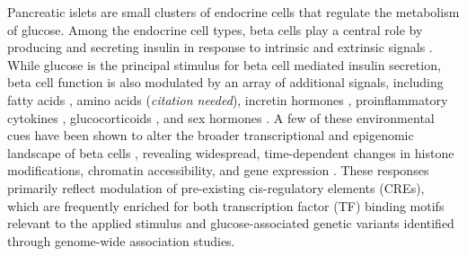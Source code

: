 Pancreatic islets are small clusters of endocrine cells that regulate the metabolism of glucose. Among the endocrine cell types, beta cells play a central role by producing and secreting insulin in response to intrinsic and extrinsic signals \cite{Prentki2013-vx}. While glucose is the principal stimulus for beta cell mediated insulin secretion, beta cell function is also modulated by an array of additional signals, including fatty acids \cite{Fu2013-cf,Mauvais-Jarvis2016-gm,Ramos-Rodriguez2019-ha,Aylward2021-nw}, amino acids (\textit{citation needed}), incretin hormones \cite{Saxena2010-ui}, proinflammatory cytokines \cite{Benaglio2022-rq}, glucocorticoids \cite{Aylward2021-nw,Reddy2009-qu}, and sex hormones \cite{Mauvais-Jarvis2016-gm}. A few of these environmental cues have been shown to alter the broader transcriptional and epigenomic landscape of beta cells \cite{Aylward2021-nw,Benaglio2022-rq,Ramos-Rodriguez2019-ha}, revealing widespread, time-dependent changes in histone modifications, chromatin accessibility, and gene expression \cite{Ramos-Rodriguez2019-ha,Benaglio2022-rq}. These responses primarily reflect modulation of pre-existing cis-regulatory elements (CREs), which are frequently enriched for both transcription factor (TF) binding motifs relevant to the applied stimulus and glucose-associated genetic variants identified through genome-wide association studies.


